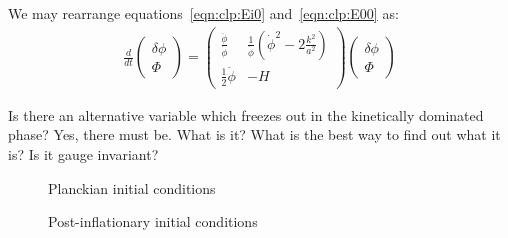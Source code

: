 We may rearrange equations~\eqref{eqn:clp:Ei0} and~\eqref{eqn:clp:E00} as:
\begin{align}
  \frac{d}{dt}
  \left(
  \begin{array}{c}
    \delta \phi \\
    \Phi
  \end{array}
  \right)
  =
  \left(%
  \begin{array}{cc}
    \frac{\ddot{\phi}}{\dot{\phi}} & \frac{1}{\dot{\phi}}\left( \dot{\phi}^2 - 2\frac{k^2}{a^2} \right) \\
    \frac{1}{2}\dot{\phi} & -H 
  \end{array}
  \right)
  \left(%
  \begin{array}{c}
    \delta \phi \\
    \Phi
  \end{array}
  \right)
\end{align}


Is there an alternative variable which freezes out in the kinetically dominated phase? Yes, there must be. What is it? What is the best way to find out what it is? Is it gauge invariant?

\ifdefined\lightweight
\else
\begin{figure}
  
  
  \caption{Planckian initial conditions}
\end{figure}

\begin{figure}
  
  
  \caption{Post-inflationary initial conditions}
\end{figure}
\fi
